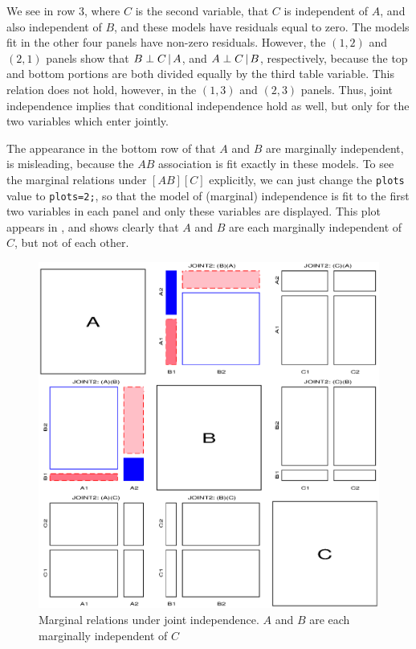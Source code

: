We see in row 3, where $C$ is the second variable, that $C$ is independent
of $A$, and also independent of $B$, and these models have residuals
equal to zero.
The models fit in the other four panels have non-zero residuals.
However, the $(1, 2)$ and $(2, 1)$ panels show that
$B \perp C \, | \, A$, and $A \perp C \, | \, B$, respectively, because
the top and bottom portions are both divided equally by the third table
variable.
This relation does not hold, however, in the $(1, 3)$ and $(2, 3)$ panels.
Thus, joint independence implies that conditional independence hold
as well, but only for the two variables which enter jointly.

The appearance in the bottom row of 
that $A$ and $B$ are marginally independent, is
misleading, because the $AB$ association is fit exactly in these models.
To see the marginal relations under $[A B][C]$ explicitly,
we can just change the \texttt{plots} value to \texttt{plots=2;},
so that the model of (marginal) independence is fit to the first two
variables in each panel and only these variables are displayed.
This plot appears in , and shows
clearly that $A$ and $B$ are each marginally independent of $C$,
but not of each other.
\begin{figure}[htb]
  \centering
  \includegraphics[scale=.6]{ch4/fig/mosfit-22}
  \caption[Marginal relations under joint independence]{Marginal relations under joint independence.  $A$ and $B$ are each marginally independent
 of $C$}%
  \label{fig:mosfit-22}
\end{figure}

